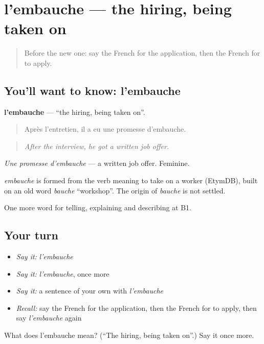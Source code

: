 \section[l'embauche]{l'embauche — the hiring, being taken on}

\label{lesson:FR-C354-embauche}



\begin{quote}
Before the new one: say the French for the application, then the French for to apply.
\end{quote}

\subsection*{You'll want to know: l'embauche}
\textbf{l'embauche} — \textquotedblleft{}the hiring, being taken on\textquotedblright{}.

\begin{quote}
Après l'entretien, il a eu une promesse d'embauche.
\end{quote}

\begin{quote}
\emph{After the interview, he got a written job offer.}
\end{quote}

\emph{Une promesse d'embauche} — a written job offer. Feminine.

\begin{cousinweb}
\emph{embauche} is formed from the verb meaning to take on a worker (EtymDB), built on an old word \emph{bauche} \textquotedblleft{}workshop\textquotedblright{}. The origin of \emph{bauche} is not settled.
\end{cousinweb}

\begin{grammarlens}[title={What you've built}]
One more word for telling, explaining and describing at B1.
\end{grammarlens}

\subsection*{Your turn}
\begin{itemize}
\raggedright
  \item \emph{Say it:} \emph{l'embauche}
  \item \emph{Say it:} \emph{l'embauche}, once more
  \item \emph{Say it:} a sentence of your own with \emph{l'embauche}
  \item \emph{Recall:} say the French for the application, then the French for to apply, then say \emph{l'embauche} again
\end{itemize}

\begin{tcolorbox}[breakable,colback=teal!4,colframe=teal!35!black,title={Before you move on}]
What does l'embauche mean? (\textquotedblleft{}The hiring, being taken on\textquotedblright{}.) Say it once more.
\end{tcolorbox}
